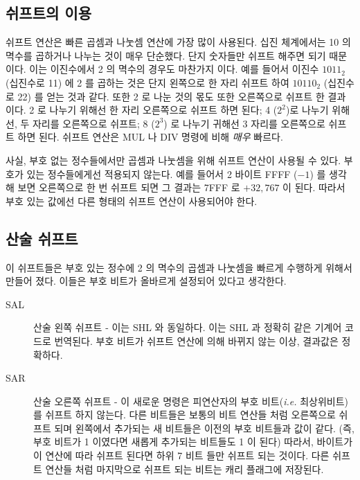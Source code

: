 \subsection{쉬프트의 이용}

쉬프트 연산은 빠른 곱셈과 나눗셈 연산에 가장 많이 사용된다. 십진 체계에서는
10 의 멱수를 곱하거나 나누는 것이 매우 단순했다. 단지 숫자들만 쉬프트 해주면
되기 때문이다. 이는 이진수에서 2 의 멱수의 경우도 마찬가지 이다. 예를 들어서 
이진수 $1011_2$ (십진수로 11) 에 2 를 곱하는 것은 단지 왼쪽으로 한 자리 쉬프트
하여 $10110_2$ (십진수로 22) 를 얻는 것과 같다. 또한 2 로 나눈 것의 몫도 또한 
오른쪽으로 쉬프트 한 결과 이다. 2 로 나누기 위해선 한 자리 오른쪽으로 쉬프트
하면 된다; 4 ($2^2$)로 나누기 위해선, 두 자리를 오른쪽으로 쉬프트; 8 ($2^3$)
로 나누기 귀해선 3 자리를 오른쪽으로 쉬프트 하면 된다. 쉬프트 연산은 {\code MUL}
 나 {\code DIV}  명령에 비해 \emph{매우} 빠르다. 

사실, 부호 없는 정수들에서만 곱셈과 나눗셈을 위해 쉬프트 연산이 사용될 수 있다. 
부호가 있는 정수들에게선 적용되지 않는다. 예를 들어서 2 바이트 FFFF ($-1$) 를
생각해 보면 오른쪽으로 한 번 쉬프트 되면 그 결과는 7FFF 로 $+32,767$ 이 된다. 
따라서 부호 있는 값에선 다른 형태의 쉬프트 연산이 사용되어야 한다. 
  

\subsection{산술 쉬프트}

이 쉬프트들은 부호 있는 정수에 2 의 멱수의 곱셈과 나눗셈을 빠르게 수행하게 
위해서 만들어 졌다. 이들은 부호 비트가 올바르게 설정되어 있다고 생각한다. 

\begin{description}
\item[SAL]  산술 왼쪽 쉬프트 - 이는 {\code SHL} 와 동일하다. 
           이는 {\code SHL} 과 정확히 같은 기계어 코드로 번역된다. 부호 비트가 
           쉬프트 연산에 의해 바뀌지 않는 이상, 결과값은 정확하다. 
\item[SAR]  산술 오른쪽 쉬프트 - 이 새로운 명령은 피연산자의 부호
           비트(\emph{i.e.} 최상위비트) 를 쉬프트 하지 않는다. 다른 비트들은
           보통의 비트 연산들 처럼 오른쪽으로 쉬프트 되며 왼쪽에서 추가되는 새 
           비트들은 이전의 부호 비트들과 값이 같다. (즉, 부호 비트가 1 이였다면 
           새롭게 추가되는 비트들도 1 이 된다) 따라서, 바이트가 이 연산에 따라 
           쉬프트 된다면 하위 7 비트 들만 쉬프트 되는 것이다. 다른 쉬프트 연산들
           처럼 마지막으로 쉬프트 되는 비트는 캐리 플래그에 저장된다. 
\end{description}

